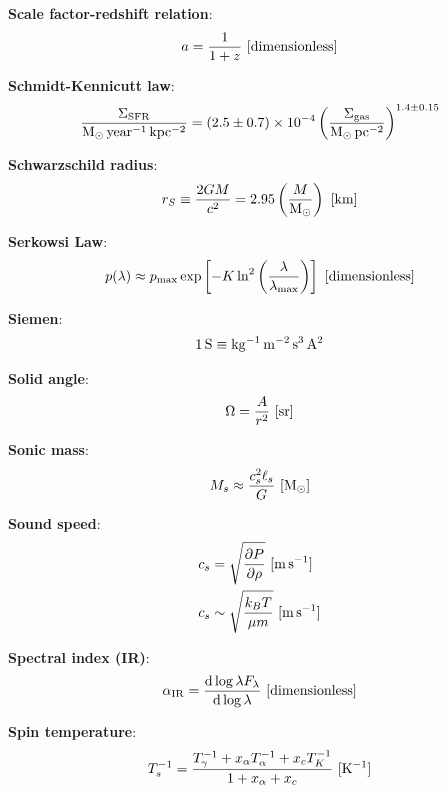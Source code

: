 \documentclass[a4paper,10pt]{article}
\begin{document}
{\noindent}\textbf{Scale factor-redshift relation}:
\begin{align*}
    a = \dfrac{1}{1+z} ~ [{\rm dimensionless}]
\end{align*}

{\noindent}\textbf{Schmidt-Kennicutt law}:
\begin{align*}
    \frac{\Sigma_\mathrm{SFR}}{{\rm M_\odot\,year^{-1}\,kpc^{-2}}} = (2.5\pm0.7)\times10^{-4} \left(\frac{\Sigma_\mathrm{gas}}{{\rm M_\odot\,pc^{-2}}}\right)^{1.4\pm0.15}
\end{align*}

{\noindent}\textbf{Schwarzschild radius}:
\begin{align*}
    r_S \equiv \frac{2GM}{c^2} = 2.95\left(\frac{M}{{\rm M_\odot}}\right) ~ [{\rm km}]
\end{align*}

{\noindent}\textbf{Serkowsi Law}:
\begin{align*}
    p(\lambda) \approx p_\mathrm{max}\exp \left[-K\ln^2\left(\frac{\lambda}{\lambda_\mathrm{max}}\right)\right] ~ [{\rm dimensionless}]
\end{align*}

{\noindent}\textbf{Siemen}:
\begin{align*}
    {\rm 1\,S \equiv kg^{-1}\,m^{-2}\,s^3\,A^2}
\end{align*}

{\noindent}\textbf{Solid angle}:
\begin{align*}
    \Omega = \frac{A}{r^2} ~ [{\rm sr}]
\end{align*}

{\noindent}\textbf{Sonic mass}:
\begin{align*}
    M_s \approx \frac{c_s^2\ell_s}{G} ~ [{\rm M_\odot}]
\end{align*}

{\noindent}\textbf{Sound speed}:
\begin{align*}
    c_s &= \sqrt{\frac{\partial P}{\partial\rho}} ~ [{\rm m\,s^{-1}}] \\
    c_s &\sim \sqrt{\frac{k_BT}{\mu m}} ~ [{\rm m\,s^{-1}}]
\end{align*}

{\noindent}\textbf{Spectral index (IR)}:
\begin{align*}
    \alpha_{\rm IR} = \frac{{\rm d}\log\lambda F_\lambda}{{\rm d}\log \lambda} ~ [{\rm dimensionless}]
\end{align*}

{\noindent}\textbf{Spin temperature}:
\begin{align*}
    T_s^{-1} = \frac{T_\gamma^{-1} + x_\alpha T_\alpha^{-1} + x_cT_K^{-1}}{1+x_\alpha+x_c} ~ [{\rm K^{-1}}]
\end{align*}
\end{document}
